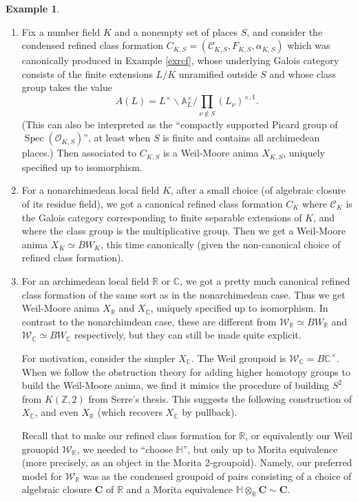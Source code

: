 \documentclass[12pt]{article}
\theoremstyle{definition}
\newtheorem{example}[theorem]{Example}
\newcommand{\on}{\operatorname}
\newcommand{\mc}{\mathcal}
\newcommand{\mbb}{\mathbb}
\begin{document}
\begin{example}\label{wmex}
\begin{enumerate}
\item Fix a number field $K$ and a nonempty set of places $S$, and consider the condensed refined class formation $C_{K,S} = (\mc{C}_{K,S},F_{K,S},\alpha_{K,S})$ which was canonically produced in Example \ref{exrcf}, whose underlying Galois category consists of the finite extensions $L/K$ unramified outside $S$ and whose class group takes the value
$$A(L) = L^\times \backslash \mathbb{A}_L^\times / \prod_{\nu\not\in S} (L_\nu)^{\times, 1}.$$
(This can also be interpreted as the ``compactly supported Picard group of $\on{Spec}(\mc{O}_{K,S})$'', at least when $S$ is finite and contains all archimedean places.)  Then associated to $C_{K,S}$ is a Weil-Moore anima $X_{K,S}$, uniquely specified up to isomorphism.
\item For a nonarchimedean local field $K$, after a small choice (of algebraic closure of its residue field), we got a canonical refined class formation $C_K$ where $\mc{C}_K$ is the Galois category corresponding to finite separable extensions of $K$, and where the class group is the multiplicative group.  Then we get a Weil-Moore anima $X_K\simeq BW_K$, this time canonically (given the non-canonical choice of refined class formation).
\item For an archimedean local field $\mbb{R}$ or $\mbb{C}$, we got a pretty much canonical refined class formation of the same sort as in the nonarchimedean case.  Thus we get Weil-Moore anima $X_{\mbb{R}}$ and $X_{\mbb{C}}$, uniquely specified up to isomorphism.  In contrast to the nonarchimdean case, these are different from $\mc{W}_{\mbb{R}}\simeq BW_{\mbb{R}}$ and $\mc{W}_{\mbb{C}}\simeq BW_{\mbb{C}}$ respectively, but they can still be made quite explicit.

For motivation, consider the simpler $X_{\mbb{C}}$.  The Weil groupoid is $\mc{W}_{\mbb{C}}=B\mbb{C}^\times$.  When we follow the obstruction theory for adding higher homotopy groups to build the Weil-Moore anima, we find it mimics the procedure of building $S^2$ from $K(\mbb{Z},2)$ from Serre's thesis.  This suggests the following construction of $X_{\mbb{C}}$, and even $X_{\mbb{R}}$ (which recovers $X_{\mbb{C}}$ by pullback).

Recall that to make our refined class formation for $\mbb{R}$, or equivalently our Weil grouopid $\mc{W}_{\mbb{R}}$, we needed to ``choose $\mbb{H}$'', but only up to Morita equivalence (more precisely, as an object in the Morita 2-groupoid).  Namely, our preferred model for $\mc{W}_{\mbb{R}}$
was as the condensed groupoid of pairs consisting of a choice of algebraic closure $\mathbf{C}$ of $\mbb{R}$ and a Morita equivalence $\mathbb{H}\otimes_{\mathbb{R}}\mathbf{C}\sim \mathbf{C}$.


\end{enumerate}
\end{example}
\end{document}
